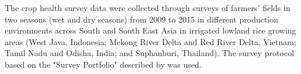 The crop health survey data were collected through surveys of farmers' fields in two seasons (wet and dry seasons) from 2009 to 2015 in different production environments across South and South East Asia in irrigated lowland rice growing areas (West Java, Indonesia; Mekong River Delta and Red River Delta, Vietnam; Tamil Nadu and Odisha, India; and Suphanburi, Thailand). The survey protocol based on the "Survey Portfolio" described by  was used. %




